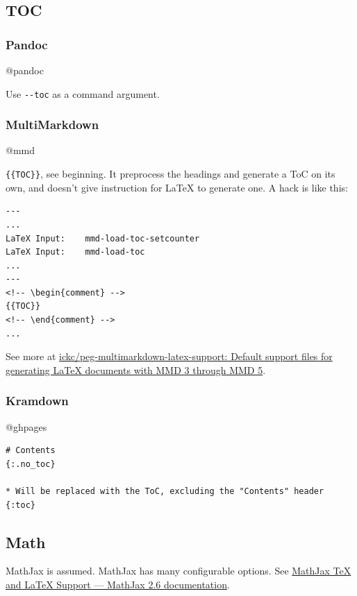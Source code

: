 \documentclass[]{article}
\begin{document}
\subsection{TOC}\label{toc}

\subsubsection{Pandoc}\label{pandoc-1}

@pandoc

Use \texttt{-\/-toc} as a command argument.

\subsubsection{MultiMarkdown}\label{multimarkdown-1}

@mmd

\texttt{\{\{TOC\}\}}, see beginning. It preprocess the headings and
generate a ToC on its own, and doesn't give instruction for LaTeX to
generate one. A hack is like this:

\begin{verbatim}
---
...
LaTeX Input:    mmd-load-toc-setcounter
LaTeX Input:    mmd-load-toc
...
---
<!-- \begin{comment} -->
{{TOC}}
<!-- \end{comment} -->
...
\end{verbatim}

See more at
\href{https://github.com/ickc/peg-multimarkdown-latex-support}{ickc/peg-multimarkdown-latex-support:
Default support files for generating LaTeX documents with MMD 3 through
MMD 5}.

\subsubsection{Kramdown}\label{kramdown}

@ghpages

\begin{verbatim}
# Contents
{:.no_toc}

* Will be replaced with the ToC, excluding the "Contents" header
{:toc}
\end{verbatim}

\subsection{Math}\label{math}

MathJax is assumed. MathJax has many configurable options. See
\href{http://mathjax.readthedocs.org/en/latest/tex.html}{MathJax TeX and
LaTeX Support --- MathJax 2.6 documentation}.
\end{document}
